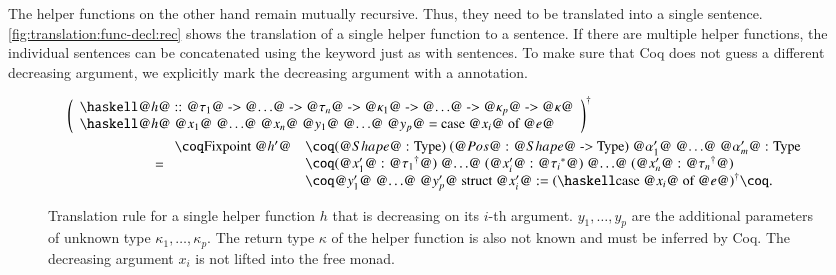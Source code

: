The helper functions on the other hand remain mutually recursive.
Thus, they need to be translated into a single  sentence.
\autoref{fig:translation:func-decl:rec} shows the translation of a single helper function to a  sentence.
If there are multiple helper functions, the individual  sentences can be concatenated using the  keyword just as with  sentences.
To make sure that Coq does not guess a different decreasing argument, we explicitly mark the decreasing argument with a  annotation.

\begin{figure}[H]
  \begin{align*}
    &\toCoq{\left(\begin{array}{l}
      \haskellM{@$h$@ :: @$\tau_1$@ -> @$\ldots$@ -> @$\tau_n$@ -> @$\kappa_1$@ -> @$\ldots$@ -> @$\kappa_p$@ -> @$\kappa$@} \\
      \haskellM{@$h$@ @$x_1$@ @$\ldots$@ @$x_n$@ @$y_1$@ @$\ldots$@ @$y_p$@ = case @$x_i$@ of @$e$@}
    \end{array}\right)}
    \\
    &\qquad\qquad\qquad=
    \begin{array}{ll}
      \coqM{Fixpoint @$h'$@}
        &\coqM{(@$\Shape$@ : Type) (@$\Pos$@ : @$\Shape$@ -> Type) {@$\alpha_1'$@ @$\ldots$@ @$\alpha_m'$@ : Type}} \\
        &\coqM{(@$x_1'$@ : @$\toCoqX{\tau_1}$@) @$\ldots$@ (@$x_i'$@ : @$\toCoqTX{\tau_i}$@) @$\ldots$@ (@$x_n'$@ : @$\toCoqX{\tau_n}$@)} \\
        &\coqM{@$y_1'$@ @$\ldots$@ @$y_p'$@ {struct @$x_i'$@} :=}\;\toCoq{(\haskellM{case @$x_i$@ of @$e$@})}\coqM{.}  \\
    \end{array}
  \end{align*}
  \caption{
    Translation rule for a single helper function $h$ that is decreasing on its $i$-th argument.
    $y_1, \ldots, y_p$ are the additional parameters of unknown type $\kappa_1, \ldots, \kappa_p$.
    The return type $\kappa$ of the helper function is also not known and must be inferred by Coq.
    The decreasing argument $x_i$ is not lifted into the free monad.
  }
  \label{fig:translation:func-decl:rec}
\end{figure}


